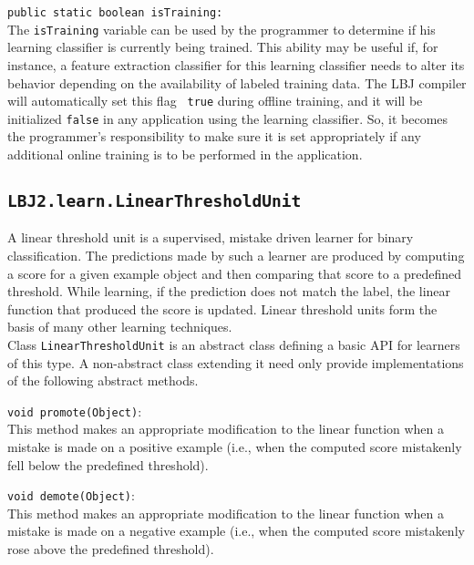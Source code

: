 \begin{list}{}{}
\item[{\tt public static boolean isTraining:}] ~\\
The {\tt isTraining} variable can be used by the programmer to determine if
his learning classifier is currently being trained.  This ability may be
useful if, for instance, a feature extraction classifier for this learning
classifier needs to alter its behavior depending on the availability of
labeled training data.  The LBJ compiler will automatically set this flag {\tt
true} during offline training, and it will be initialized {\tt false} in any
application using the learning classifier.  So, it becomes the programmer's
responsibility to make sure it is set appropriately if any additional online
training is to be performed in the application.
\end{list}

\subsection{{\tt LBJ2.learn.LinearThresholdUnit}} \label{subsection:LTU}
A linear threshold unit is a supervised, mistake driven learner for binary
classification.  The predictions made by such a learner are produced by
computing a score for a given example object and then comparing that score to
a predefined threshold.  While learning, if the prediction does not match the
label, the linear function that produced the score is updated.  Linear
threshold units form the basis of many other learning techniques. \\

Class {\tt LinearThresholdUnit} is an abstract class defining a basic API for
learners of this type.  A non-abstract class extending it need only provide
implementations of the following abstract methods.

\begin{list}{}{}
\item[{\tt void promote(Object)}:] ~\\
This method makes an appropriate modification to the linear function
when a mistake is made on a positive example (i.e., when the computed score
mistakenly fell below the predefined threshold).

\item[{\tt void demote(Object)}:] ~\\
This method makes an appropriate modification to the linear function
when a mistake is made on a negative example (i.e., when the computed score
mistakenly rose above the predefined threshold).
\end{list}

